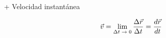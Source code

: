 \documentclass[12pt, a5paper]{article}
\begin{document}
+ Velocidad instantánea

$$
\Large{
\vec{v} =  \lim_{\Delta t\;\rightarrow\;0}{\frac{\Delta \vec{r} }{\Delta t}} = \frac{d \vec{r}}{dt}
}
$$
\end{document}
